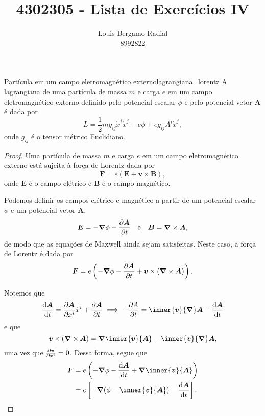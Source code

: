 \documentclass[12pt,a4paper]{article}
\title{4302305 - Lista de Exercícios IV}
\author{Louis Bergamo Radial\\8992822}
\newcommand\vetor[1]{\ensuremath{\boldsymbol{#1}}}
\begin{document}
\maketitle
\begin{lemma}{Partícula em um campo eletromagnético externo}{lagrangiana_lorentz}
    A lagrangiana de uma partícula de massa \(m\) e carga \(e\) em um campo eletromagnético externo definido pelo potencial escalar \(\phi\) e pelo potencial vetor \(\vetor{A}\) é dada por
    \begin{equation*}
        L = \frac12 m g_{ij} \dot{x}^i \dot{x}^j - e \phi + e g_{ij} A^i \dot{x}^j,
    \end{equation*}
    onde \(g_{ij}\) é o tensor métrico Euclidiano.
\end{lemma}
\begin{proof}
    Uma partícula de massa \(m\) e carga \(e\) em um campo eletromagnético externo está sujeita à força de Lorentz dada por
    \begin{equation*}
        \vetor{F} = e\left(\vetor{E} + \vetor{v}\times\vetor{B}\right),
    \end{equation*}
    onde \(\vetor{E}\) é o campo elétrico e \(\vetor{B}\) é o campo magnético.

    Podemos definir os campos elétrico e magnético a partir de um potencial escalar \(\phi\) e um potencial vetor \(\vetor{A}\),
    \begin{equation*}
        \vetor{E} = -\vetor{\nabla}\phi - \diffp{\vetor{A}}{t}\quad\text{e}\quad\vetor{B} = \vetor{\nabla} \times \vetor{A},
    \end{equation*}
    de modo que as equações de Maxwell ainda sejam satisfeitas. Neste caso, a força de Lorentz é dada por
    \begin{equation*}
        \vetor{F} = e\left(-\vetor{\nabla}\phi - \diffp{\vetor{A}}{t} + \vetor{v}\times (\vetor{\nabla}\times \vetor{A})\right).
    \end{equation*}

    Notemos que
    \begin{equation*}
        \diff{\vetor{A}}{t} = \diffp{\vetor{A}}{x^i}\dot{x}^i + \diffp{\vetor{A}}{t} \implies -\diffp{A}{t} = \inner{\vetor{v}}{\vetor{\nabla}}\vetor{A} - \diff{\vetor{A}}{t}
    \end{equation*}
    e que
    \begin{equation*}
        \vetor{v} \times (\vetor{\nabla}\times \vetor{A}) = \vetor{\nabla}\inner{\vetor{v}}{\vetor{A}} - \inner{\vetor{v}}{\vetor{\nabla}}\vetor{A},
    \end{equation*}
    uma vez que \(\diffp{\vetor{v}}{x^i} = 0\). Dessa forma, segue que
    \begin{align*}
        \vetor{F} &= e\left(-\vetor{\nabla}\phi - \diff{\vetor{A}}{t} + \vetor{\nabla}\inner{\vetor{v}}{\vetor{A}}\right)\\
                  &= e \left[- \vetor{\nabla}(\phi - \inner{\vetor{v}}{\vetor{A}}) - \diff{\vetor{A}}{t}\right].
    \end{align*}


\end{proof}
\end{document}
